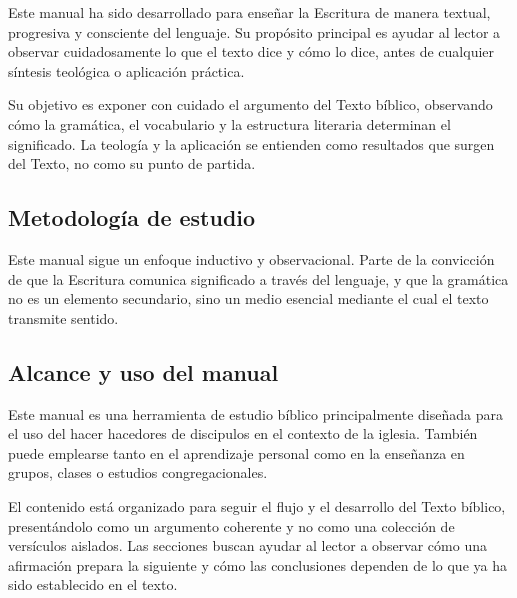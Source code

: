 \documentclass[11pt]{article}
\begin{document}
\begin{paraHfour}
Este manual ha sido desarrollado para enseñar la Escritura de manera textual, progresiva y consciente del lenguaje. Su propósito principal es ayudar al lector a observar cuidadosamente lo que el texto dice y cómo lo dice, antes de cualquier síntesis teológica o aplicación práctica.
\end{paraHfour}

\begin{paraHfour}
Su objetivo es exponer con cuidado el argumento del Texto bíblico, observando cómo la gramática, el vocabulario y la estructura literaria determinan el significado. La teología y la aplicación se entienden como resultados que surgen del Texto, no como su punto de partida.
\end{paraHfour}

\subsection{Metodología de estudio}\label{metodologuxeda-de-estudio}

\begin{paraHfour}
Este manual sigue un enfoque inductivo y observacional. Parte de la convicción de que la Escritura comunica significado a través del lenguaje, y que la gramática no es un elemento secundario, sino un medio esencial mediante el cual el texto transmite sentido.
\end{paraHfour}

\subsection{Alcance y uso del manual}\label{alcance-y-uso-del-manual}

\begin{paraHfour}
Este manual es una herramienta de estudio bíblico principalmente diseñada para el uso del hacer hacedores de discipulos en el contexto de la iglesia. También puede emplearse tanto en el aprendizaje personal como en la enseñanza en grupos, clases o estudios congregacionales.
\end{paraHfour}

\begin{paraHfour}
El contenido está organizado para seguir el flujo y el desarrollo del Texto bíblico, presentándolo como un argumento coherente y no como una colección de versículos aislados. Las secciones buscan ayudar al lector a observar cómo una afirmación prepara la siguiente y cómo las conclusiones dependen de lo que ya ha sido establecido en el texto.
\end{paraHfour}
\end{document}
